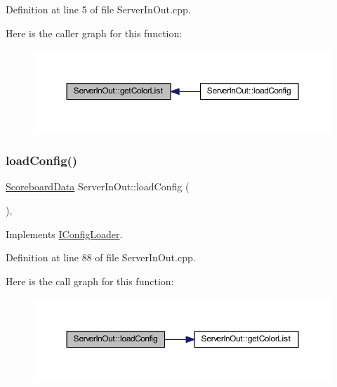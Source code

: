 Definition at line 5 of file Server\+In\+Out.\+cpp.

Here is the caller graph for this function\+:
\nopagebreak
\begin{figure}[H]
\begin{center}
\leavevmode
\includegraphics[width=350pt]{class_server_in_out_a952f5812bddca76e92d5432c1890551d_icgraph}
\end{center}
\end{figure}
\mbox{\label{class_server_in_out_a0525bb536f865858156f5d1527fcaeb6}} 
\subsubsection{\texorpdfstring{load\+Config()}{loadConfig()}}
{\footnotesize\ttfamily \hyperlink{struct_scoreboard_data}{Scoreboard\+Data} Server\+In\+Out\+::load\+Config (\begin{DoxyParamCaption}{ }\end{DoxyParamCaption})\hspace{0.3cm}{\ttfamily [override]}, {\ttfamily [virtual]}}



Implements \hyperlink{class_i_config_loader_a951944a5f13c09ce045bca8aa9c6154a}{I\+Config\+Loader}.



Definition at line 88 of file Server\+In\+Out.\+cpp.

Here is the call graph for this function\+:
\nopagebreak
\begin{figure}[H]
\begin{center}
\leavevmode
\includegraphics[width=350pt]{class_server_in_out_a0525bb536f865858156f5d1527fcaeb6_cgraph}
\end{center}
\end{figure}
\mbox{\label{class_server_in_out_a5442d5353fbf8445b7df75ee23c3322a}} 
